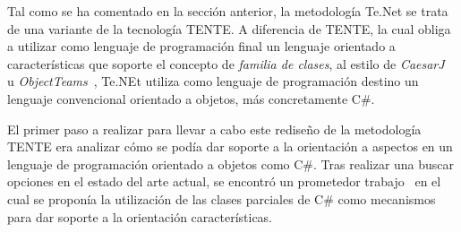 
Tal como se ha comentado en la sección anterior, la metodología Te.Net se trata de una variante de la tecnología TENTE. A diferencia de TENTE, la cual obliga a utilizar como lenguaje de programación final un lenguaje orientado a características que soporte el concepto de \emph{familia de clases}, al estilo de \emph{CaesarJ}~\citep{ivica:2006} u \emph{ObjectTeams}~\citep{stephan:2002}, Te.NEt utiliza como lenguaje de programación destino un lenguaje convencional orientado a objetos, más concretamente C\#.

El primer paso a realizar para llevar a cabo este rediseño de la metodología TENTE era analizar cómo se podía dar soporte a la orientación a aspectos en un lenguaje de programación orientado a objetos como C\#. Tras realizar una buscar opciones en el estado del arte actual, se encontró un prometedor trabajo~\citep{perez:2011} en el cual se proponía la utilización de las clases parciales de C\# como mecanismos para dar soporte a la orientación características.


